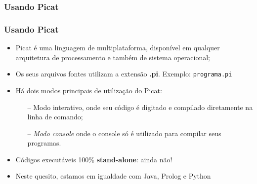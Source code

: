 
\subsubsection{Usando Picat}

\begin{frame}
  \frametitle{Usando Picat}
  	\begin{itemize}
    
      \item Picat é uma linguagem de multiplataforma, disponível em qualquer arquitetura de 
      processamento e também de sistema operacional;
      \item Os seus arquivos fontes utilizam a extensão \textbf{.pi}. Exemplo: \texttt{programa.pi}
      \item Há dois modos principais de utilização do Picat: 
      
      \begin{itemize}
      	\item[--] Modo interativo, onde seu código é digitado e compilado diretamente na linha de 
        comando;
      	\item[--] \textit{Modo console} onde o console só é utilizado para compilar seus programas.
      \end{itemize}
      
      \item Códigos executáveis 100\% \textbf{stand-alone}: ainda não!
      \item Neste quesito, estamos em igualdade com Java, Prolog e Python
     
    \end{itemize}
\end{frame}

